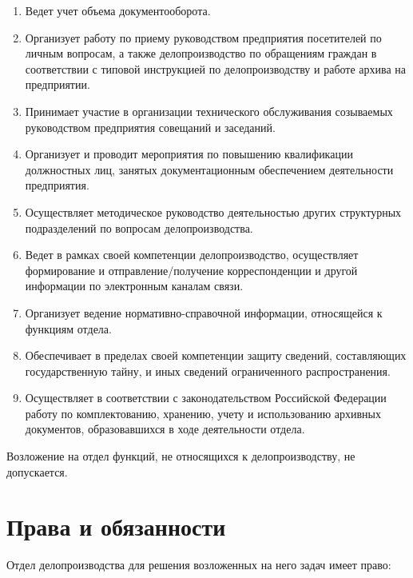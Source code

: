 \documentclass[a4paper,12pt]{article}
\begin{document}
\begin{enumerate}
	\item Ведет учет объема документооборота.
	
	\item Организует работу по приему руководством предприятия посетителей по личным вопросам, а также делопроизводство по обращениям граждан в соответствии с типовой инструкцией по делопроизводству и работе архива на предприятии.
	
	\item Принимает участие в организации технического обслуживания созываемых руководством предприятия совещаний и заседаний.
	
	\item Организует и проводит мероприятия по повышению квалификации должностных лиц, занятых документационным обеспечением деятельности предприятия.
	
	\item Осуществляет методическое руководство деятельностью других структурных подразделений по вопросам делопроизводства.
	
	\item Ведет в рамках своей компетенции делопроизводство, осуществляет формирование и отправление/получение корреспонденции и другой информации по электронным каналам связи.
	
	\item Организует ведение нормативно-справочной информации, относящейся к функциям отдела.
	
	\item Обеспечивает в пределах своей компетенции защиту сведений, составляющих государственную тайну, и иных сведений ограниченного распространения.
	
	\item Осуществляет в соответствии с законодательством Российской Федерации работу по комплектованию, хранению, учету и использованию архивных документов, образовавшихся в ходе деятельности отдела.
\end{enumerate}

Возложение на отдел функций, не относящихся к делопроизводству, не допускается.

\section{Права и обязанности}

Отдел делопроизводства для решения возложенных на него задач имеет право:
\end{document}
